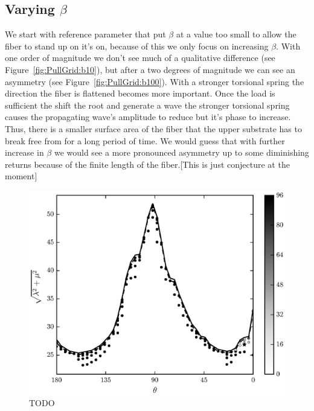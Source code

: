 \subsection{Varying $\beta$}

We start with reference parameter that put $\beta$ at a value too small to allow the fiber to stand up on it's on, because of this we only focus on increasing $\beta$. With one order of magnitude we don't see much of a qualitative difference (see Figure~\ref{fig:PullGrid:b10}), but after a two degrees of magnitude we can see an asymmetry (see Figure~\ref{fig:PullGrid:b100}). With a stronger torsional spring the direction the fiber is flattened becomes more important. Once the load is sufficient the shift the root and generate a wave the stronger torsional spring causes the propagating wave's amplitude to reduce but it's phase to increase. Thus, there is a smaller surface area of the fiber that the upper substrate has to break free from for a long period of time. We would guess that with further increase in $\beta$ we would see a more pronounced asymmetry up to some diminishing returns because of the finite length of the fiber.[This is just conjecture at the moment]

	\begin{figure}
		\begin{center}
			\includegraphics{./fig/ch3/pull/eb0.1/grid.eps}
		\end{center}		
		\caption{ TODO
		\label{fig:PullGrid:eb0.1}}
	\end{figure}

